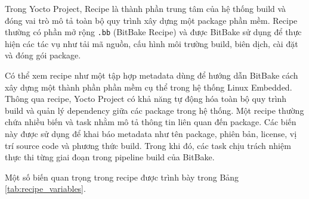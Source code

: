 Trong Yocto Project, Recipe là thành phần trung tâm của hệ thống build và đóng vai trò mô tả toàn bộ quy trình xây dựng một package phần mềm. Recipe thường có phần mở rộng \texttt{.bb} (BitBake Recipe) và được BitBake sử dụng để thực hiện các tác vụ như tải mã nguồn, cấu hình môi trường build, biên dịch, cài đặt và đóng gói package.\cite{yocto_new_recipe} 

Có thể xem recipe như một tập hợp metadata dùng để hướng dẫn BitBake cách xây dựng một thành phần phần mềm cụ thể trong hệ thống Linux Embedded. Thông qua recipe, Yocto Project có khả năng tự động hóa toàn bộ quy trình build và quản lý dependency giữa các package trong hệ thống. Một recipe thường chứa nhiều biến và task nhằm mô tả thông tin liên quan đến package. Các biến này được sử dụng để khai báo metadata như tên package, phiên bản, license, vị trí source code và phương thức build. Trong khi đó, các task chịu trách nhiệm thực thi từng giai đoạn trong pipeline build của BitBake. 

Một số biến quan trọng trong recipe được trình bày trong Bảng \ref{tab:recipe_variables}.

